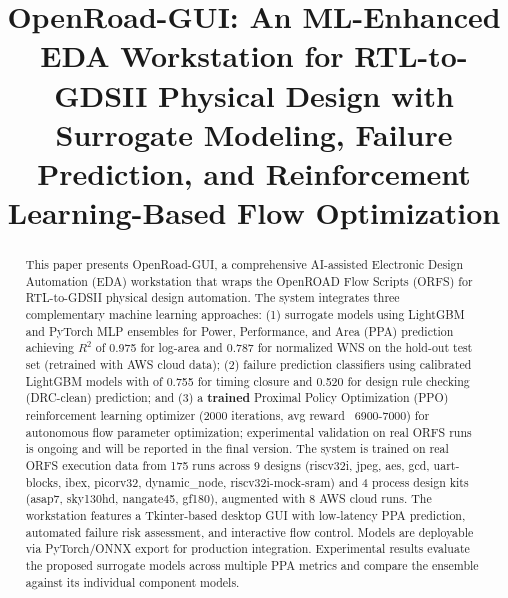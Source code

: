 \documentclass[10pt,conference]{IEEEtran}
\newcommand{\Rtwo}{$R^2$}
\newcommand{\AUC}{\text{AUC}}
\begin{document}
\title{OpenRoad-GUI: An ML-Enhanced EDA Workstation for RTL-to-GDSII Physical Design with Surrogate Modeling, Failure Prediction, and Reinforcement Learning-Based Flow Optimization}

\author{
}

\maketitle


\begin{abstract}
This paper presents OpenRoad-GUI, a comprehensive AI-assisted Electronic Design Automation (EDA) workstation that wraps the OpenROAD Flow Scripts (ORFS) for RTL-to-GDSII physical design automation. The system integrates three complementary machine learning approaches: (1) surrogate models using LightGBM and PyTorch MLP ensembles for Power, Performance, and Area (PPA) prediction achieving \Rtwo{} of 0.975 for log-area and 0.787 for normalized WNS on the hold-out test set (retrained with AWS cloud data); (2) failure prediction classifiers using calibrated LightGBM models with \AUC{} of 0.755 for timing closure and 0.520 for design rule checking (DRC-clean) prediction; and (3) a \textbf{trained} Proximal Policy Optimization (PPO) reinforcement learning optimizer (2000 iterations, avg reward ~6900-7000) for autonomous flow parameter optimization; experimental validation on real ORFS runs is ongoing and will be reported in the final version. The system is trained on real ORFS execution data from 175 runs across 9 designs (riscv32i, jpeg, aes, gcd, uart-blocks, ibex, picorv32, dynamic\_node, riscv32i-mock-sram) and 4 process design kits (asap7, sky130hd, nangate45, gf180), augmented with 8 AWS cloud runs. The workstation features a Tkinter-based desktop GUI with low-latency PPA prediction, automated failure risk assessment, and interactive flow control. Models are deployable via PyTorch/ONNX export for production integration. Experimental results evaluate the proposed surrogate models across multiple PPA metrics and compare the ensemble against its individual component models.
\end{abstract}
\end{document}
